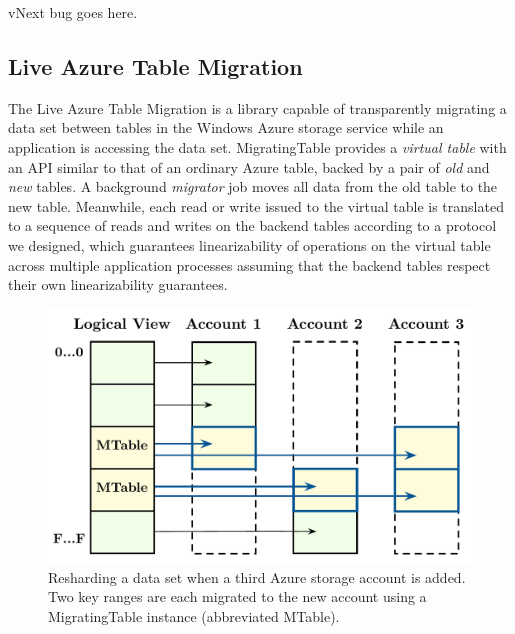 vNext bug goes here.

\subsection{Live Azure Table Migration}
\label{sec:cases:migration}

The Live Azure Table Migration is a library capable of transparently migrating a data set between tables in the Windows Azure storage service while an application is accessing the data set.  MigratingTable provides a \emph{virtual table} with an API similar to that of an ordinary Azure table, backed by a pair of \emph{old} and \emph{new}  tables.  A background \emph{migrator} job moves all data from the old table to the new table.  Meanwhile, each read or write issued to the virtual table is translated to a sequence of reads and writes on the backend tables according to a protocol we designed, which guarantees linearizability of operations on the virtual table across multiple application processes assuming that the backend tables respect their own linearizability guarantees.

\begin{figure}[t]
\centering
\includegraphics[width=\linewidth]{img/livemigration}
\caption{Resharding a data set when a third Azure storage account is added. Two key ranges are each migrated to the new account using a MigratingTable instance (abbreviated MTable).}
\label{fig:livemigration}
\end{figure}

